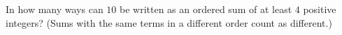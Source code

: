 In how many ways can $10$ be written as an ordered sum of at least $4$ positive integers? (Sums with the same terms in a different order count as different.)
